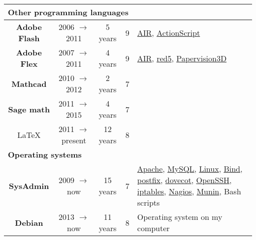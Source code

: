 \documentclass[utf8x,helvetica,narrow,english,logo,totpages]{europecv}
\newcommand{\years}{years}
\newcommand{\present}{present}
\begin{document}
\begin{europecv}
{\begin{tabular}{ | c | c | c | c | >{\centering\arraybackslash}p{2.282cm} |}
    \multicolumn{5}{|l|}{\textbf{Other programming languages}} \\ \hline

    \textbf{Adobe Flash}
        & 2006 $\to$ 2011
        & 5 \years
        & 9
        & \href{http://www.adobe.com/products/air.html}{AIR}, \href{http://help.adobe.com/livedocs/specs/actionscript/3/wwhelp/wwhimpl/js/html/wwhelp.htm}{ActionScript}
    \\ \hline

    \textbf{Adobe Flex}
        & 2007 $\to$ 2011
        & 4 \years
        & 9
        & \href{http://www.adobe.com/products/air.html}{AIR}, \href{http://www.red5.org/}{red5}, \href{https://en.wikipedia.org/wiki/Papervision3D}{Papervision3D}
    \\ \hline

    \textbf{Mathcad}
        & 2010 $\to$ 2012
        & 2 \years
        & 7
        &
    \\ \hline

    \textbf{Sage math}
        & 2011 $\to$ 2015
        & 4 \years
        & 7
        &
    \\ \hline

    \LaTeX{}
        & 2011 $\to$ \present
        & 12 \years
        & 8
        &
    \\ \hline \hline


    \multicolumn{5}{|l|}{\textbf{Operating systems}} \\ \hline

    \textbf{\hspace{-0.2cm} SysAdmin \hspace{-0.20cm}}
        & 2009 $\to$ now
        & 15 years
        & 7
        & \footnotesize{\href{http://httpd.apache.org/}{Apache}, \href{http://www.mysql.com/}{MySQL}, \href{https://www.kernel.org/}{Linux}, \href{https://www.isc.org/downloads/bind/}{Bind}, \href{http://www.postfix.org/}{postfix}, \href{http://www.dovecot.org/}{dovecot}, \href{http://www.openssh.com/}{OpenSSH}, \href{http://www.netfilter.org/projects/iptables/index.html}{iptables}, \href{https://www.nagios.org/}{Nagios}, \href{http://munin-monitoring.org/}{Munin}, Bash scripts}
    \\ \hline

    \textbf{\hspace{-0.20cm} Debian \hspace{-0.20cm}}
        & 2013 $\to$ now
        & 11 years
        & 8
        & \footnotesize{Operating system on my computer}
    \\ \hline


\end{tabular}}
\end{europecv}
\end{document}
